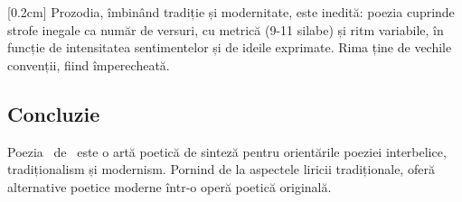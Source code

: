 [0.2cm]
Prozodia, îmbinând tradiție și modernitate, este inedită: poezia cuprinde strofe inegale ca număr de versuri, cu metrică (9-11 silabe) și ritm variabile, în funcție de intensitatea sentimentelor și de ideile exprimate. Rima ține de vechile convenții, fiind împerecheată.


\subsection{Concluzie}

Poezia \operatitle\ de \operaauthor\ este o artă poetică de sinteză pentru orientările poeziei interbelice, tradiționalism și modernism. Pornind de la aspectele liricii tradiționale, oferă alternative poetice moderne într-o operă poetică originală.
